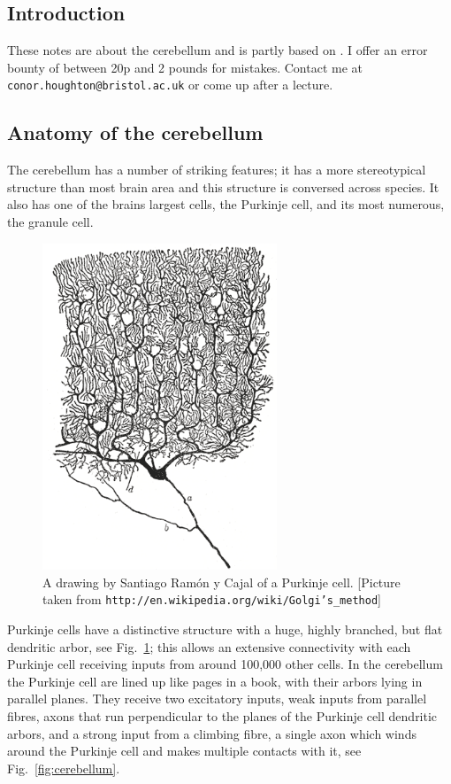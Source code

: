 \documentclass[11pt,a4paper]{scrartcl}
\begin{document}
\subsection*{Introduction}
These notes are about the cerebellum and is partly based on \cite{Albus1971a}. I offer an error bounty of
between 20p and 2 pounds for mistakes. Contact me at
\texttt{conor.houghton@bristol.ac.uk} or come up after a lecture.

\subsection*{Anatomy of the cerebellum}
The cerebellum has a number of striking features; it has a more stereotypical structure than most brain area and this structure is conversed across species. It also has one of the brains largest cells, the Purkinje cell, and its most numerous, the granule cell. 

\begin{figure}
\begin{center}
\includegraphics[width=7cm]{Purkinje_cell_by_Cajal.png}
\end{center}
\caption{A drawing by Santiago Ram\'{o}n y Cajal of a Purkinje cell. [Picture taken from \texttt{http://en.wikipedia.org/wiki/Golgi's\_method}]\label{fig:PC}}
\end{figure}

Purkinje cells have a distinctive structure with a huge, highly
branched, but flat dendritic arbor, see Fig.~\ref{fig:PC}; this allows
an extensive connectivity with each Purkinje cell receiving inputs
from around 100,000 other cells. In the cerebellum the Purkinje cell
are lined up like pages in a book, with their arbors lying in parallel
planes. They receive two excitatory inputs, weak inputs from parallel
fibres, axons that run perpendicular to the planes of the Purkinje
cell dendritic arbors, and a strong input from a climbing fibre, a
single axon which winds around the Purkinje cell and makes multiple
contacts with it, see Fig.~\ref{fig:cerebellum}.
\end{document}
